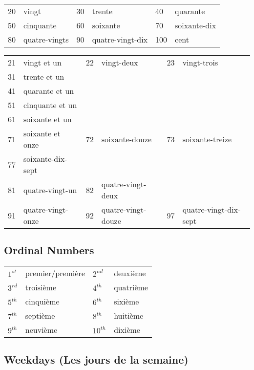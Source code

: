 \begin{tabular}{| l | l | l | l | l | l |}
\hline
20  & vingt         & 30  & trente          & 40  & quarante\\
50  & cinquante     & 60  & soixante        & 70  & soixante-dix\\
80  & quatre-vingts & 90  & quatre-vingt-dix& 100 & cent\\
\hline
\end{tabular}
\vspace{.5in}

\begin{tabular}{| l | l | l | l | l | l |}
\hline
21 & vingt et un    & 22 & vingt-deux       & 23 & vingt-trois \\
31 & trente et un &&&&\\
41 & quarante et un &&&&\\
51 & cinquante et un &&&&\\
61 & soixante et un &&&&\\
71 & soixante et onze & 72 & soixante-douze & 73 & soixante-treize\\
77 & soixante-dix-sept &&&&\\
81 & quatre-vingt-un& 82 & quatre-vingt-deux & & \\
91 & quatre-vingt-onze & 92 & quatre-vingt-douze & 97 & quatre-vingt-dix-sept\\
\hline
\end{tabular}

\subsection{Ordinal Numbers}
\begin{tabular}{| l | l | l | l |}
\hline
$1^{st}$  & premier/premi\`ere  & $2^{nd}$   & deuxi\`eme   \\
$3^{rd}$  & troisi\`eme         & $4^{th}$   & quatri\`eme  \\
$5^{th}$  & cinqui\`eme         & $6^{th}$   & sixi\`eme    \\
$7^{th}$  & septi\`eme          & $8^{th}$   & huiti\`eme   \\
$9^{th}$  & neuvi\`eme          & $10^{th}$  & dixi\`eme    \\
\hline
\end{tabular}

\subsection{Weekdays (Les jours de la semaine)}

